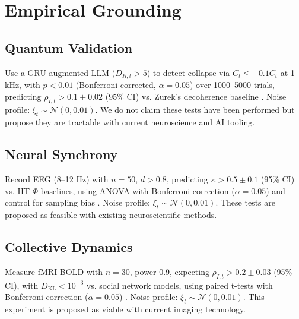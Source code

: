 \documentclass[11pt]{article}
\newcommand{\dkl}{D_{\text{KL}}}
\begin{document}

\section{Empirical Grounding}
\label{sec:empirical}

\subsection{Quantum Validation}
Use a GRU-augmented LLM ($D_{R,t} > 5$) to detect collapse via $\dot{C}_t \leq -0.1 C_t$ at 1 kHz, with $p < 0.01$ (Bonferroni-corrected, $\alpha = 0.05$) over 1000–5000 trials, predicting $\rho_{I,t} > 0.1 \pm 0.02$ (95\% CI) vs. Zurek’s decoherence baseline \citep{engel2023}. Noise profile: $\xi_t \sim \mathcal{N}(0, 0.01)$. We do not claim these tests have been performed but propose they are tractable with current neuroscience and AI tooling.

\subsection{Neural Synchrony}
Record EEG (8–12 Hz) with $n = 50$, $d > 0.8$, predicting $\kappa > 0.5 \pm 0.1$ (95\% CI) vs. IIT $\Phi$ baselines, using ANOVA with Bonferroni correction ($\alpha = 0.05$) and control for sampling bias \citep{panksepp1998}. Noise profile: $\xi_t \sim \mathcal{N}(0, 0.01)$. These tests are proposed as feasible with existing neuroscientific methods.

\subsection{Collective Dynamics}
Measure fMRI BOLD with $n = 30$, power 0.9, expecting $\rho_{I,t} > 0.2 \pm 0.03$ (95\% CI), with $\dkl < 10^{-3}$ vs. social network models, using paired t-tests with Bonferroni correction ($\alpha = 0.05$) \citep{couzin2023}. Noise profile: $\xi_t \sim \mathcal{N}(0, 0.01)$. This experiment is proposed as viable with current imaging technology.
\end{document}
